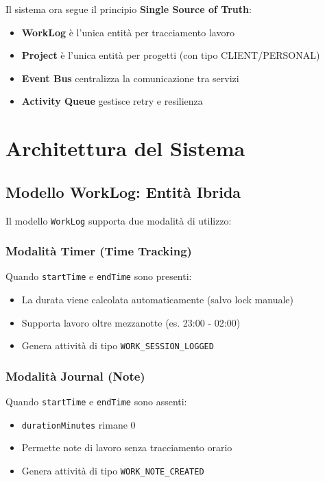 \documentclass[11pt,a4paper]{article}
\begin{document}
Il sistema ora segue il principio \textbf{Single Source of Truth}:

\begin{itemize}
    \item \textbf{WorkLog} è l'unica entità per tracciamento lavoro
    \item \textbf{Project} è l'unica entità per progetti (con tipo CLIENT/PERSONAL)
    \item \textbf{Event Bus} centralizza la comunicazione tra servizi
    \item \textbf{Activity Queue} gestisce retry e resilienza
\end{itemize}

\section{Architettura del Sistema}

\subsection{Modello WorkLog: Entità Ibrida}

Il modello \texttt{WorkLog} supporta due modalità di utilizzo:

\subsubsection{Modalità Timer (Time Tracking)}
Quando \texttt{startTime} e \texttt{endTime} sono presenti:
\begin{itemize}
    \item La durata viene calcolata automaticamente (salvo lock manuale)
    \item Supporta lavoro oltre mezzanotte (es. 23:00 - 02:00)
    \item Genera attività di tipo \texttt{WORK\_SESSION\_LOGGED}
\end{itemize}

\subsubsection{Modalità Journal (Note)}
Quando \texttt{startTime} e \texttt{endTime} sono assenti:
\begin{itemize}
    \item \texttt{durationMinutes} rimane 0
    \item Permette note di lavoro senza tracciamento orario
    \item Genera attività di tipo \texttt{WORK\_NOTE\_CREATED}
\end{itemize}
\end{document}

